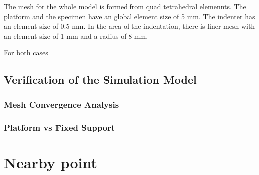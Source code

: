 The mesh for the whole model is formed from quad tetrahedral elemennts. The platform and 
the specimen have an global element size of 5 mm. The indenter has an element size of
0.5 mm. In the area of the indentation, there is finer mesh with an element size of
1 mm and a radius of 8 mm. 



For both cases 

\subsection{Verification of the Simulation Model}

\subsubsection*{Mesh Convergence Analysis}
\subsubsection*{Platform vs Fixed Support}


\section{Nearby point}


